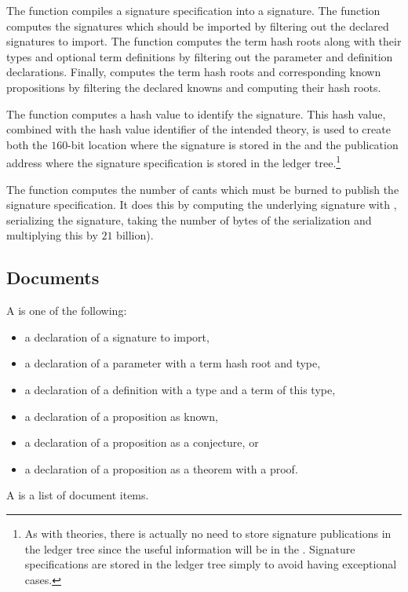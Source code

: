 The function
{}
compiles a signature specification into a signature.
The function {} computes the signatures which should be imported
by filtering out the declared signatures to import.
The function {} computes the term hash roots along with their types
and optional term definitions by filtering out the parameter and definition
declarations.
Finally, {} computes the term hash roots and corresponding known
propositions by filtering the declared knowns and computing their hash roots.

The function {} computes a hash value to identify the signature.
This hash value, combined with the hash value identifier of the intended theory,
is used to create both the $160$-bit location where the signature is stored
in the {}
and the publication address where the signature specification is stored in the ledger tree.\footnote{As with theories, there is actually no need to store signature publications in the ledger tree since the useful information will be in the {}. Signature specifications are stored in the ledger tree simply to
avoid having exceptional cases.}

The function {} computes the number of cants which must
be burned
to publish the signature specification. It does this by computing the underlying signature with {},
serializing the signature, taking the number of bytes of the serialization and multiplying this by
$21$ billion).


\subsection{Documents}

A {} is one of the following:
\begin{itemize}
\item a declaration of a signature to import,
\item a declaration of a parameter with a term hash root and type,
\item a declaration of a definition with a type and a term of this type,
\item a declaration of a proposition as known,
\item a declaration of a proposition as a conjecture, or
\item a declaration of a proposition as a theorem with a proof.
\end{itemize}
A {} is a list of document items.

